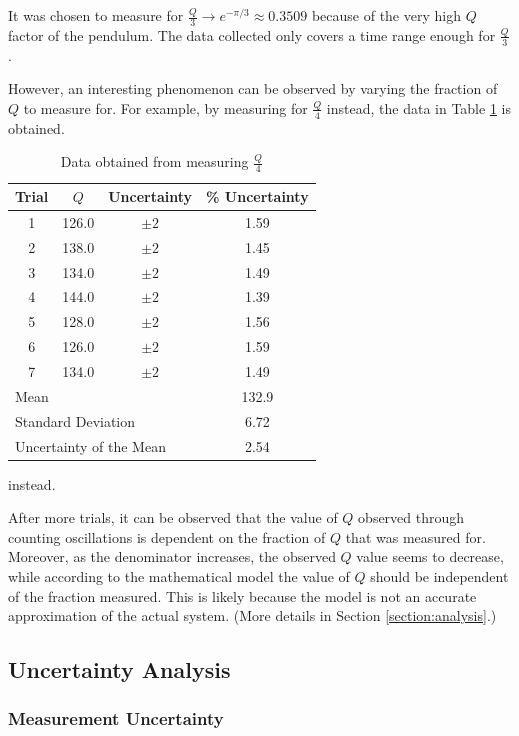 \documentclass[aps,twocolumn,secnumarabic,nobalancelastpage,amsmath,amssymb,nofootinbib,letterpaper]{revtex4}
\begin{document}
It was chosen to measure for \(\frac{Q}{3} \rightarrow e^{-\pi/3} \approx 0.3509\) because of the very high \(Q\)
factor of the pendulum. The data collected only covers a time range enough for \(\frac{Q}{3}\).

However, an interesting phenomenon can be observed by varying the fraction of \(Q\) to measure for.
For example, by measuring for \(\frac{Q}{4}\) instead, the data in Table \ref{table:oscillation4} is obtained.
\begin{table}[h]
    \begin{tabular}{c|c|c|c}
        Trial & \(Q\) & Uncertainty & \% Uncertainty \\
        \hline
        1   & 126.0 & \(\pm 2\) & 1.59 \\
        2   & 138.0 & \(\pm 2\) & 1.45 \\
        3	& 134.0 & \(\pm 2\) & 1.49 \\
        4	& 144.0 & \(\pm 2\) & 1.39 \\
        5	& 128.0 & \(\pm 2\) & 1.56 \\
        6	& 126.0 & \(\pm 2\) & 1.59 \\
        7	& 134.0 & \(\pm 2\) & 1.49 \\
        \hline
        \multicolumn{3}{l}{Mean} & 132.9 \\
        \multicolumn{3}{l}{Standard Deviation} & 6.72 \\
        \multicolumn{3}{l}{Uncertainty of the Mean} & 2.54
    \end{tabular}
    \caption{Data obtained from measuring \(\frac{Q}{4}\)} instead.
    \label{table:oscillation4}
\end{table}

After more trials, it can be observed that the value of \(Q\) observed through counting oscillations is dependent on the
fraction of \(Q\) that was measured for. Moreover, as the denominator increases, the observed \(Q\) value seems to
decrease, while according to the mathematical model the value of \(Q\) should be independent of the fraction measured.
This is likely because the model is not an accurate approximation of the actual system. (More details in Section
\ref{section:analysis}.)

\subsection{Uncertainty Analysis}
\label{section:uncertainty}

\subsubsection{Measurement Uncertainty}
\end{document}
